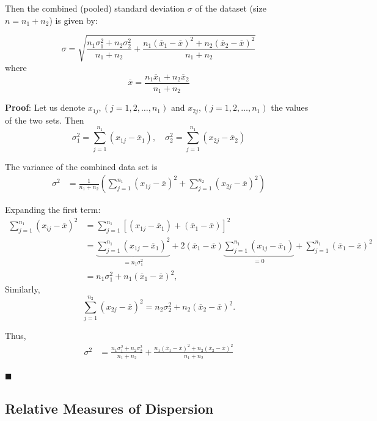 \documentclass[twoside]{book}
\begin{document}
\begin{enumerate}
\begin{textbox}
{Then the combined (pooled) standard deviation \( \sigma \) of the dataset (size \( n = n_1 + n_2 \)) is given by:}

\[
\sigma = \sqrt{
\frac{n_1 \sigma_1^2 + n_2 \sigma_2^2}{n_1 + n_2} + \frac{n_1 (\overline{x}_1 - \overline{x})^2 + n_2 (\overline{x}_2 - \overline{x})^2}{n_1 + n_2}
}
\]
where
\[
\overline{x} = \frac{n_1 \overline{x}_1 + n_2 \overline{x}_2}{n_1 + n_2}
\]
\end{textbox}

\textbf{Proof}: Let us denote $x_{1j}, (j=1,2,\dots, n_1)$ and $x_{2j}, (j=1,2,\dots, n_1)$ the values of the two sets. Then
$$\sigma_1^2 =\sum_{j=1}^{n_1} (x_{1j} - \overline{x}_1), \quad \sigma_2^2 =\sum_{j=1}^{n_1} (x_{2j} - \overline{x}_2)$$


The variance of the combined data set is
\begin{align*}
\sigma^2 &= \frac{1}{n_1 + n_2} \left(\sum_{j=1}^{n_1} (x_{1j} - \overline{x})^2 + \sum_{j=1}^{n_2} (x_{2j} - \overline{x})^2 \right)
\end{align*}

Expanding the first term:
\begin{align*}
\sum_{j=1}^{n_1} (x_{ij} - \overline{x})^2 &= \sum_{j=1}^{n_1} \left[(x_{1j} - \overline{x}_1) + (\overline{x}_1 - \overline{x})\right]^2 \\
&= \underbrace{\sum_{j=1}^{n_1} (x_{1j} - \overline{x}_1)^2}_{= n_1\sigma_1^2} + 2(\overline{x}_1 - \overline{x}) \underbrace{\sum_{j=1}^{n_1} (x_{1j} - \overline{x}_1)}_{= 0} + \sum_{j=1}^{n_1} (\overline{x}_1 - \overline{x})^2 \\
&= n_1 \sigma_1^2 + n_1 (\overline{x}_1 - \overline{x})^2,
\end{align*}
Similarly,
\[
\sum_{j=1}^{n_2} (x_{2j} - \overline{x})^2 = n_2 \sigma_2^2 + n_2 (\overline{x}_2 - \overline{x})^2.
\]

Thus,
\begin{align*}
\sigma^2 &= \frac{n_1 \sigma_1^2 + n_2 \sigma_2^2}{n_1 + n_2} + \frac{n_1 (\overline{x}_1 - \overline{x})^2 + n_2 (\overline{x}_2 - \overline{x})^2}{n_1 + n_2}
\end{align*}

\hfill $\blacksquare$

\end{enumerate}

\subsection{Relative Measures of Dispersion}
\end{document}
